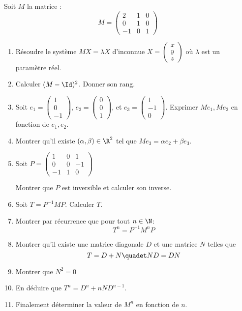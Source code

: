 \documentclass[a4paper, 11pt,reqno]{article}
\begin{document}
\begin{exercice}
Soit $M$ la matrice : 
$$M=\left( \begin{array}{ccc}
2 &1& 0\\
0 &1 & 0  \\
 -1&0&1
\end{array}\right) $$

\begin{enumerate}
\item  Résoudre le système $MX=\lambda X$ d'inconnue $X =\left(
\begin{array}{c}
x\\
y\\
z
\end{array}
 \right)$ où $\lambda$ est un paramètre réel. 
\item Calculer $(M- \Id)^2$. Donner son rang.

 \item Soit $e_1= \left(
\begin{array}{c}
1\\
0\\
-1
\end{array}
 \right)$,  $e_2= \left(
\begin{array}{c}
0\\
0\\
1
\end{array}
 \right)$, et  $e_3= \left(
\begin{array}{c}
1\\
-1\\
0
\end{array}
 \right)$.
Exprimer  $Me_1, Me_2$ en fonction de $e_1, e_2$.
\item Montrer qu'il existe $(\alpha, \beta)\in \R^2$ tel que $M e_3 = \alpha e_2 +\beta e_3$.
 
\item Soit $P= \left(
\begin{array}{ccc}
1&0&1\\
0&0&-1\\
-1&1&0
\end{array}
 \right)$ 
 
 Montrer que $P$ est inversible et calculer son inverse. 
 \item Soit $T=P^{-1}MP$. Calculer $T$. 
 \item Montrer par récurrence que pour tout $n\in \N$: 
 $$T^n = P^{-1}M^n P$$
 \item Montrer qu'il existe une matrice diagonale $D$ et une matrice $N$ telles que 
 $$T =D+N \quadet ND=DN$$
\item Montrer que $N^2=0$
\item En déduire  que $T^n = D^n +nND^{n-1}$.
\item Finalement déterminer la valeur de $M^n$ en fonction de $n$.
\end{enumerate}
\end{exercice}
\end{document}
